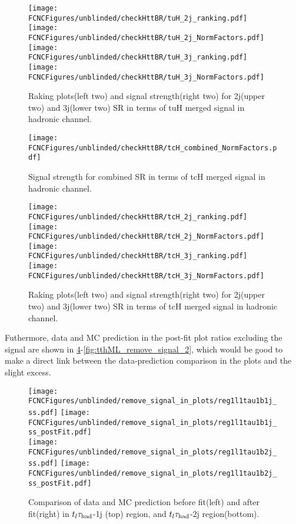 \begin{figure}[H]
\centering
\texttt{[image: \\FCNCFigures/unblinded/checkHttBR/tuH\_2j\_ranking.pdf]}
\texttt{[image: \\FCNCFigures/unblinded/checkHttBR/tuH\_2j\_NormFactors.pdf]}
\\
\texttt{[image: \\FCNCFigures/unblinded/checkHttBR/tuH\_3j\_ranking.pdf]}
\texttt{[image: \\FCNCFigures/unblinded/checkHttBR/tuH\_3j\_NormFactors.pdf]}
\caption{Raking plots(left two) and signal strength(right two) for 2j(upper two) and 3j(lower two) SR in terms of tuH merged signal in hadronic channel.}
\label{fig:xTFW_tuH_23j_NF}
\end{figure}


\begin{figure}[H]
\centering
\texttt{[image: \\FCNCFigures/unblinded/checkHttBR/tcH\_combined\_NormFactors.pdf]}
\\
\caption{Signal strength for combined SR in terms of tcH merged signal in hadronic channel.}
\label{fig:xTFW_tcH_NF}
\end{figure}

\begin{figure}[H]
\centering
\texttt{[image: \\FCNCFigures/unblinded/checkHttBR/tcH\_2j\_ranking.pdf]}
\texttt{[image: \\FCNCFigures/unblinded/checkHttBR/tcH\_2j\_NormFactors.pdf]}
\\
\texttt{[image: \\FCNCFigures/unblinded/checkHttBR/tcH\_3j\_ranking.pdf]}
\texttt{[image: \\FCNCFigures/unblinded/checkHttBR/tcH\_3j\_NormFactors.pdf]}
\caption{Raking plots(left two) and signal strength(right two) for 2j(upper two) and 3j(lower two) SR in terms of tcH merged signal in hadronic channel.}
\label{fig:xTFW_tcH_23j_NF}
\end{figure}


Futhermore, data and MC prediction in the post-fit plot ratios excluding the signal are shown in \ref{fig:tthML_remove_signal_1}-\ref{fig:tthML_remove_signal_2}, which would be good to make a direct link between the data-prediction comparison in the plots and the slight excess. 

\begin{figure}[H]
\centering
\texttt{[image: \\FCNCFigures/unblinded/remove\_signal\_in\_plots/reg1l1tau1b1j\_ss.pdf]}
\texttt{[image: \\FCNCFigures/unblinded/remove\_signal\_in\_plots/reg1l1tau1b1j\_ss\_postFit.pdf]}
\\
\texttt{[image: \\FCNCFigures/unblinded/remove\_signal\_in\_plots/reg1l1tau1b2j\_ss.pdf]}
\texttt{[image: \\FCNCFigures/unblinded/remove\_signal\_in\_plots/reg1l1tau1b2j\_ss\_postFit.pdf]}
\caption{Comparison of data and MC prediction before fit(left) and after fit(right) in $t_l\tau_\text{had}$-1j (top) region, and $t_l\tau_\text{had}$-2j region(bottom).}
\label{fig:tthML_remove_signal_1}
\end{figure}

